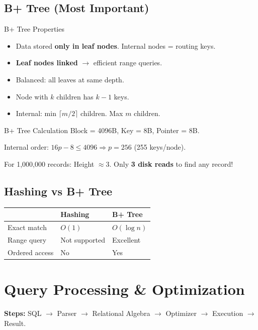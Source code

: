 \documentclass[12pt,a4paper]{article}
\begin{document}
\subsection{B+ Tree (Most Important)}
\begin{conceptbox}{B+ Tree Properties}
\begin{itemize}
    \item Data stored \textbf{only in leaf nodes}. Internal nodes = routing keys.
    \item \textbf{Leaf nodes linked} $\to$ efficient range queries.
    \item Balanced: all leaves at same depth.
    \item Node with $k$ children has $k-1$ keys.
    \item Internal: min $\lceil m/2 \rceil$ children. Max $m$ children.
\end{itemize}
\end{conceptbox}

\begin{examplebox}{B+ Tree Calculation}
Block = 4096B, Key = 8B, Pointer = 8B.

Internal order: $16p - 8 \leq 4096 \Rightarrow p = 256$ (255 keys/node).

For 1,000,000 records: Height $\approx 3$. Only \textbf{3 disk reads} to find any record!
\end{examplebox}

\subsection{Hashing vs B+ Tree}
\begin{center}
\begin{tabular}{@{}l l l@{}}
\toprule
& \textbf{Hashing} & \textbf{B+ Tree} \\
\midrule
Exact match & $O(1)$ & $O(\log n)$ \\
Range query & Not supported & Excellent \\
Ordered access & No & Yes \\
\bottomrule
\end{tabular}
\end{center}

\section{Query Processing \& Optimization}

\textbf{Steps:} SQL $\to$ Parser $\to$ Relational Algebra $\to$ Optimizer $\to$ Execution $\to$ Result.
\end{document}
